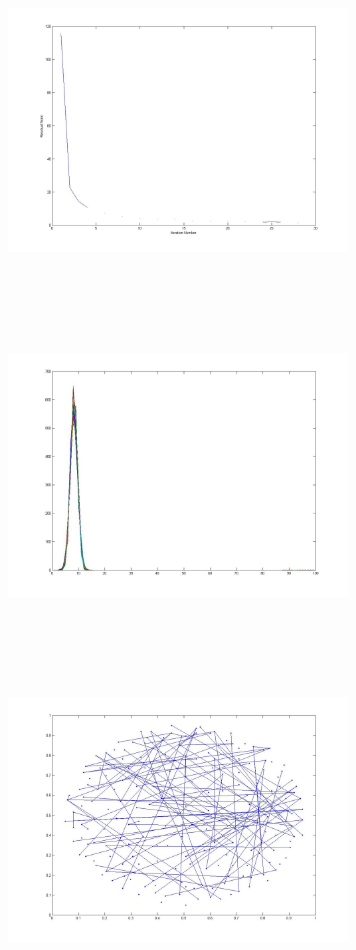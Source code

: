 \includegraphics[width=9.0cm,height=9.0cm]{images/GraphTheory/CVX_NNMF_Residuals.jpg}
\includegraphics[width=9.0cm,height=9.0cm]{images/GraphTheory/Eigenvalues_of_Whshart_Follow_TracyWidom.jpg}
\includegraphics[width=9.0cm,height=9.0cm]{images/GraphTheory/ErdosReyni_G_LT_giant_thresh_.jpg}
